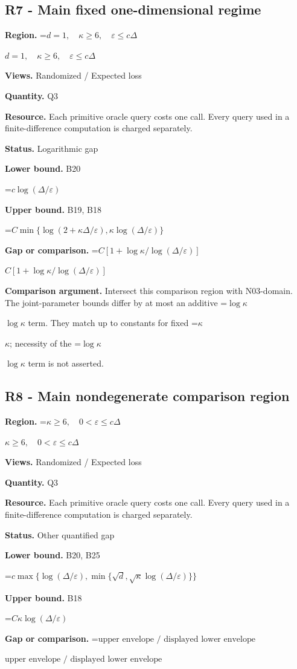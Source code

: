 \documentclass[10pt,a4paper]{article}
\newcommand{\AtlasMath}[1]{\par\begingroup\centering\setbox0=\hbox{$\displaystyle #1$}\ifdim\wd0>1.4\linewidth\typeout{ATLAS WIDE FORMULA: \the\wd0}\fi\ifdim\wd0>\linewidth\resizebox{\linewidth}{!}{\box0}\else\box0\fi\par\endgroup}
\newcommand{\AtlasInlineMath}[1]{\begingroup\setbox0=\hbox{$#1$}\ifdim\wd0>.4\linewidth\endgroup\AtlasMath{#1}\else\endgroup$#1$\fi}
\begin{document}
\subsection{R7 - Main fixed one-dimensional regime}
\textbf{Region.} \AtlasInlineMath{d=1,\quad\kappa\ge6,\quad\varepsilon\le c\Delta}

\textbf{Views.} Randomized / Expected loss

\textbf{Quantity.} Q3

\textbf{Resource.} Each primitive oracle query costs one call. Every query used in a finite-difference computation is charged separately.

\textbf{Status.} Logarithmic gap

\textbf{Lower bound.} B20

\AtlasMath{c\log(\Delta/\varepsilon)}
\textbf{Upper bound.} B19, B18

\AtlasMath{C\min\{\log(2+\kappa\Delta/\varepsilon),\kappa\log(\Delta/\varepsilon)\}}
\textbf{Gap or comparison.} \AtlasInlineMath{C[1+\log\kappa/\log(\Delta/\varepsilon)]}

\textbf{Comparison argument.} Intersect this comparison region with N03-domain. The joint-parameter bounds differ by at most an additive \AtlasInlineMath{\log\kappa} term. They match up to constants for fixed \AtlasInlineMath{\kappa}; necessity of the \AtlasInlineMath{\log\kappa} term is not asserted.

\subsection{R8 - Main nondegenerate comparison region}
\textbf{Region.} \AtlasInlineMath{\kappa\ge6,\quad0<\varepsilon\le c\Delta}

\textbf{Views.} Randomized / Expected loss

\textbf{Quantity.} Q3

\textbf{Resource.} Each primitive oracle query costs one call. Every query used in a finite-difference computation is charged separately.

\textbf{Status.} Other quantified gap

\textbf{Lower bound.} B20, B25

\AtlasMath{c\max\{\log(\Delta/\varepsilon),\min\{\sqrt d,\sqrt\kappa\log(\Delta/\varepsilon)\}\}}
\textbf{Upper bound.} B18

\AtlasMath{C\kappa\log(\Delta/\varepsilon)}
\textbf{Gap or comparison.} \AtlasInlineMath{\text{upper envelope / displayed lower envelope}}
\end{document}
